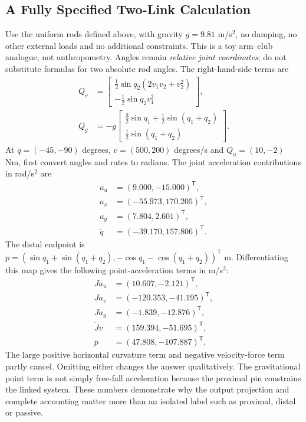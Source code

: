 \subsection{A Fully Specified Two-Link Calculation}
Use the uniform rods defined above, with gravity \(g=9.81\) m/s\(^2\), no damping, no other external loads and no additional constraints. This is a toy arm--club analogue, not anthropometry. Angles remain \emph{relative joint coordinates}; do not substitute formulas for two absolute rod angles. The right-hand-side terms are
\[
 \begin{aligned}
 Q_v&=\begin{bmatrix}
 \tfrac12\sin q_2(2v_1v_2+v_2^2)\\-\tfrac12\sin q_2v_1^2
 \end{bmatrix},\\
 Q_g&=-g\begin{bmatrix}
 \tfrac32\sin q_1+\tfrac12\sin(q_1+q_2)\\
 \tfrac12\sin(q_1+q_2)
 \end{bmatrix}.
 \end{aligned}
\]
At \(q=(-45,-90)\) degrees, \(v=(500,200)\) degrees/s and \(Q_u=(10,-2)\) Nm, first convert angles and rates to radians. The joint acceleration contributions in rad/s\(^2\) are
\[
 \begin{aligned}
 a_u&=(9.000,-15.000)^{\mathsf T},\\
 a_v&=(-55.973,170.205)^{\mathsf T},\\
 a_g&=(7.804,2.601)^{\mathsf T},\\
 \ddot q&=(-39.170,157.806)^{\mathsf T}.
 \end{aligned}
\]
The distal endpoint is \(p=(\sin q_1+\sin(q_1+q_2),-\cos q_1-\cos(q_1+q_2))^{\mathsf T}\) m. Differentiating this map gives the following point-acceleration terms in m/s\(^2\):
\[
 \begin{aligned}
 Ja_u&=(10.607,-2.121)^{\mathsf T},\\
 Ja_v&=(-120.353,-41.195)^{\mathsf T},\\
 Ja_g&=(-1.839,-12.876)^{\mathsf T},\\
 \dot Jv&=(159.394,-51.695)^{\mathsf T},\\
 \ddot p&=(47.808,-107.887)^{\mathsf T}.
 \end{aligned}
\]
The large positive horizontal curvature term and negative velocity-force term partly cancel. Omitting either changes the answer qualitatively. The gravitational point term is not simply free-fall acceleration because the proximal pin constrains the linked system. These numbers demonstrate why the output projection and complete accounting matter more than an isolated label such as proximal, distal or passive.

